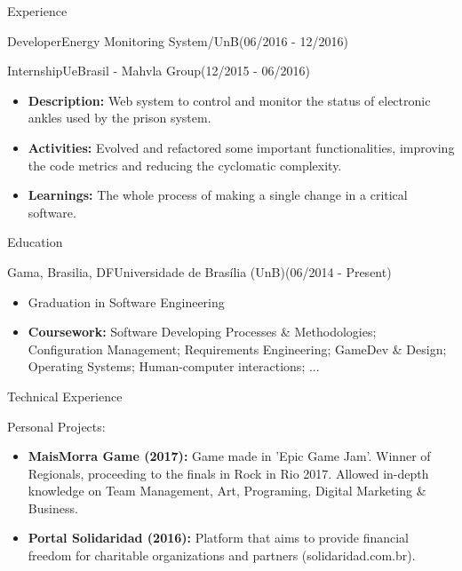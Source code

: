 \documentclass[]{fraguilarcv}
\begin{document}
\begin{cvsection}{Experience}
\begin{cvsubsection}{Developer}{Energy Monitoring System/UnB}{(06/2016 - 12/2016)}
\begin{itemize}
		\end{itemize}
	\end{cvsubsection}
	\begin{cvsubsection}{Internship}{UeBrasil - Mahvla Group}{(12/2015 - 06/2016)}
		\begin{itemize}
			\item \textbf{Description:} Web system to control and monitor the status of electronic ankles used by the prison system.
			\item \textbf{Activities:} Evolved and refactored some important functionalities, improving the code metrics and reducing the cyclomatic complexity.
			\item \textbf{Learnings:} The whole process of making a single change in a critical software.
		\end{itemize}
	\end{cvsubsection}

	\begin{cvsection}{Education}
		\begin{cvsubsection}{Gama, Brasilia, DF}{Universidade de Brasília (UnB)}{(06/2014 - Present)}
			\begin{itemize}
				\item Graduation in Software Engineering
				\item \textbf{Coursework:} {Software Developing Processes \& Methodologies; Configuration Management; Requirements Engineering; GameDev \& Design; Operating Systems; Human-computer interactions; ...}
			\end{itemize}
		\end{cvsubsection}
	\end{cvsection}

	\begin{cvsection}{Technical Experience}
		\begin{cvsubsection}{Personal Projects:}{}{}
			\begin{itemize}
				\item \textbf{MaisMorra Game (2017):} Game made in 'Epic Game Jam'. Winner of Regionals, proceeding to the finals in Rock in Rio 2017. Allowed in-depth knowledge on Team Management, Art, Programing, Digital Marketing \& Business.
				\item \textbf{Portal Solidaridad (2016):} Platform that aims to provide financial freedom for charitable organizations and partners (solidaridad.com.br).
			\end{itemize}
		\end{cvsubsection}
	\end{cvsection}
\end{cvsection}
\end{document}
